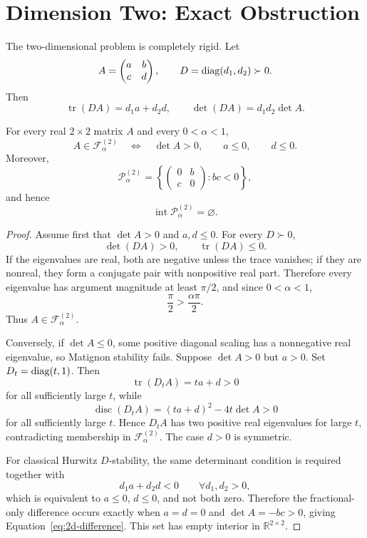 \section{Dimension Two: Exact Obstruction}\label{sec:two}

The two-dimensional problem is completely rigid. Let
\[
 A=
 \begin{pmatrix}
 a&b\\
 c&d
 \end{pmatrix},
 \qquad
 D=\operatorname{diag}(d_1,d_2)\succ0.
\]
Then
\[
 \operatorname{tr}(DA)=d_1a+d_2d,
 \qquad
 \det(DA)=d_1d_2\det A.
\]

\begin{Theorem}\label{thm:2d}
For every real \(2\times2\) matrix \(A\) and every \(0<\alpha<1\),
\begin{equation}
 A\in\mathcal F_\alpha^{(2)}
 \quad\Longleftrightarrow\quad
 \det A>0,\qquad a\le0,\qquad d\le0.
 \label{eq:2d-class}
\end{equation}
Moreover,
\begin{equation}
 \mathcal P_\alpha^{(2)}
 =
 \left\{
 \begin{pmatrix}
 0&b\\
 c&0
 \end{pmatrix}
 :bc<0
 \right\},
 \label{eq:2d-difference}
\end{equation}
and hence
\[
 \operatorname{int}\mathcal P_\alpha^{(2)}=\varnothing.
\]
\end{Theorem}

\begin{proof}
Assume first that \(\det A>0\) and \(a,d\le0\). For every \(D\succ0\),
\[
 \det(DA)>0,
 \qquad
 \operatorname{tr}(DA)\le0.
\]
If the eigenvalues are real, both are negative unless the trace vanishes; if they are nonreal, they form a conjugate pair with nonpositive real part. Therefore every eigenvalue has argument magnitude at least \(\pi/2\), and since \(0<\alpha<1\),
\[
 \frac{\pi}{2}>\frac{\alpha\pi}{2}.
\]
Thus \(A\in\mathcal F_\alpha^{(2)}\).

Conversely, if \(\det A\le0\), some positive diagonal scaling has a nonnegative real eigenvalue, so Matignon stability fails. Suppose \(\det A>0\) but \(a>0\). Set \(D_t=\operatorname{diag}(t,1)\). Then
\[
 \operatorname{tr}(D_tA)=ta+d>0
\]
for all sufficiently large \(t\), while
\[
 \operatorname{disc}(D_tA)
 =
 (ta+d)^2-4t\det A>0
\]
for all sufficiently large \(t\). Hence \(D_tA\) has two positive real eigenvalues for large \(t\), contradicting membership in \(\mathcal F_\alpha^{(2)}\). The case \(d>0\) is symmetric.

For classical Hurwitz \(D\)-stability, the same determinant condition is required together with
\[
 d_1a+d_2d<0
 \qquad
 \forall d_1,d_2>0,
\]
which is equivalent to \(a\le0\), \(d\le0\), and not both zero. Therefore the fractional-only difference occurs exactly when \(a=d=0\) and \(\det A=-bc>0\), giving Equation~\eqref{eq:2d-difference}. This set has empty interior in \(\mathbb R^{2\times2}\).
\end{proof}

